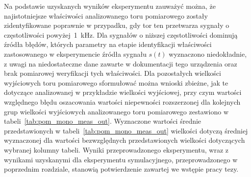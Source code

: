 Na podstawie uzyskanych wyników eksperymentu zauważyć można, że najistotniejsze właściwości analizowanego toru pomiarowego zostały zidentyfikowane poprawnie w przypadku, gdy tor ten przetwarza sygnały o częstotliwości powyżej~\qty{1}{kHz}. Dla sygnałów o niższej częstotliwości dominują źródła błędów, których parametry na etapie identyfikacji właściwości zastosowanego w eksperymencie źródła sygnału $s(t)$ wyznaczono niedokładnie, z uwagi na niedostateczne dane zawarte w dokumentacji tego urządzenia oraz brak pomiarowej weryfikacji tych właściwości. Dla pozostałych wielkości wyjściowych toru pomiarowego sformułować można wnioski zbieżne, jak te dotyczące analizowanej w przykładzie wielkości wyjściowej, przy czym wartości względnego błędu oszacowania wartości niepewności rozszerzonej dla kolejnych grup wielkości wyjściowych analizowanego toru pomiarowego zestawiono w tabeli~\ref{tab:pom_mono_meas_out}. Wyznaczone wartości średnie przedstawionych w tabeli~\ref{tab:pom_mono_meas_out} wielkości dotyczą średniej wyznaczonej dla wartości bezwzględnych przedstawionych wielkości dotyczących wybranej kolumny tabeli. Wyniki przeprowadzonego eksperymentu, wraz z wynikami uzyskanymi dla eksperymentu symulacyjnego, przeprowadzonego w poprzednim rozdziale, stanowią potwierdzenie zawartej we wstępie pracy tezy.

